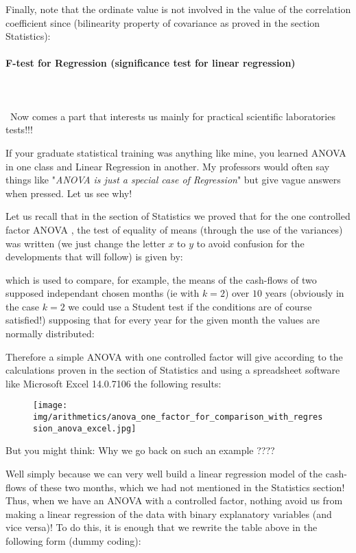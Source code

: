 	Finally, note that the ordinate value is not involved in the value of the correlation coefficient since (bilinearity property of covariance as proved in the section Statistics):
	
	
	\pagebreak
	\paragraph{F-test for Regression (significance test for linear regression)}\mbox{}\\\\\
	Now comes a part that interests us mainly for practical scientific laboratories tests!!! 
	
	If your graduate statistical training was anything like mine, you learned ANOVA in one class and Linear Regression in another.  My professors would often say things like "\textit{ANOVA is just a special case of Regression}" but give vague answers when pressed. Let us see why!
	
	Let us recall that in the section of Statistics we proved that for the one controlled factor ANOVA , the test of equality of means (through the use of the variances) was written (we just change the letter $x$ to $y$ to avoid confusion for the developments that will follow) is given by:
	
	which is used to compare, for example, the means of the cash-flows of two supposed independant chosen months (ie with $k=2$) over $10$ years (obviously in the case $k=2$ we could use a Student test if the conditions are of course satisfied!) supposing that for every year for the given month the values are normally distributed:
	
	Therefore a simple ANOVA with one controlled factor will give according to the calculations proven in the section of Statistics and using a spreadsheet software like Microsoft Excel 14.0.7106 the following results:
	\begin{figure}[H]
		\centering
		\texttt{[image: img/arithmetics/anova\_one\_factor\_for\_comparison\_with\_regression\_anova\_excel.jpg]}
	\end{figure}
	But you might think: Why we go back on such an example ????

	Well simply because we can very well build a linear regression model of the cash-flows of these two months, which we had not mentioned in the Statistics section! Thus, when we have an ANOVA with a controlled factor, nothing avoid us from making a linear regression of the data with binary explanatory variables (and vice versa)! To do this, it is enough that we rewrite the table above in the following form (dummy coding):
	
